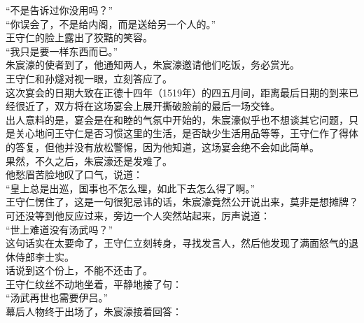 \begin{multicols}{\theparacolNo}
“不是告诉过你没用吗？”\\

“你误会了，不是给内阁，而是送给另一个人的。”\\

王守仁的脸上露出了狡黠的笑容。\\

“我只是要一样东西而已。”\\

朱宸濠的使者到了，他通知两人，朱宸濠邀请他们吃饭，务必赏光。\\

王守仁和孙燧对视一眼，立刻答应了。\\

这次宴会的日期大致在正德十四年（1519年）的四五月间，距离最后日期的到来已经很近了，双方将在这场宴会上展开撕破脸前的最后一场交锋。\\

出人意料的是，宴会是在和睦的气氛中开始的，朱宸濠似乎也不想谈其它问题，只是关心地问王守仁是否习惯这里的生活，是否缺少生活用品等等，王守仁作了得体的答复，但他并没有放松警惕，因为他知道，这场宴会绝不会如此简单。\\

果然，不久之后，朱宸濠还是发难了。\\

他愁眉苦脸地叹了口气，说道：\\

“皇上总是出巡，国事也不怎么理，如此下去怎么得了啊。”\\

王守仁愣住了，这是一句很犯忌讳的话，朱宸濠竟然公开说出来，莫非是想摊牌？\\

可还没等到他反应过来，旁边一个人突然站起来，厉声说道：\\

“世上难道没有汤武吗？”\\

这句话实在太要命了，王守仁立刻转身，寻找发言人，然后他发现了满面怒气的退休侍郎李士实。\\

话说到这个份上，不能不还击了。\\

王守仁纹丝不动地坐着，平静地接了句：\\

“汤武再世也需要伊吕。”\\

幕后人物终于出场了，朱宸濠接着回答：\\


\end{multicols}
